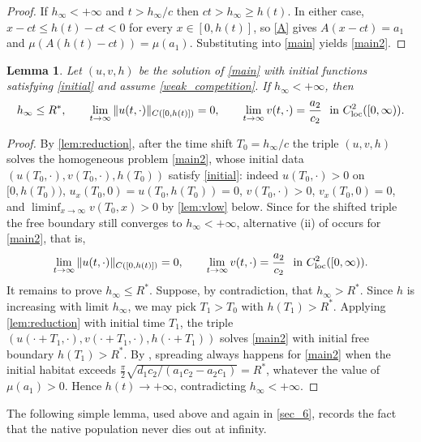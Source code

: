\documentclass[reqno]{amsart}
\theoremstyle{plain}
\newtheorem{lemma}[theorem]{Lemma}
\theoremstyle{definition}
\theoremstyle{remark}
\begin{document}
\begin{proof}
	If $h_\infty<+\infty$ and $t>h_\infty/c$ then $ct>h_\infty\ge h(t)$. In
	either case, $x-ct\le h(t)-ct<0$ for every $x\in[0,h(t)]$, so \eqref{A} gives
	$A(x-ct)=a_1$ and $\mu(A(h(t)-ct))=\mu(a_1)$. Substituting into \eqref{main}
	yields \eqref{main2}.
\end{proof}

\begin{lemma}\label{th1:lm1}
	Let $(u,v,h)$ be the solution of \eqref{main} with initial functions
	satisfying \eqref{initial} and assume \eqref{weak_competition}. If
	$h_\infty<+\infty$, then
	\[
	h_\infty\le R^*,\qquad
	\lim_{t\to\infty} \|u(t,\cdot)\|_{C([0, h(t)])} = 0,\qquad
	\lim_{t\to\infty} v(t,\cdot) = \frac{a_2}{c_2}\ \text{ in } C^2_{\rm loc}([0,\infty)).
	\]
\end{lemma}

\begin{proof}
	By \cref{lem:reduction}, after the time shift $T_0=h_\infty/c$ the triple
	$(u,v,h)$ solves the homogeneous problem \eqref{main2}, whose initial data
	$(u(T_0,\cdot),v(T_0,\cdot),h(T_0))$ satisfy \eqref{initial}: indeed
	$u(T_0,\cdot)>0$ on $[0,h(T_0))$, $u_x(T_0,0)=u(T_0,h(T_0))=0$, $v(T_0,\cdot)>0$,
	$v_x(T_0,0)=0$, and $\liminf_{x\to\infty}v(T_0,x)>0$ by \cref{lem:vlow} below.
	Since for the shifted triple the free boundary still converges to
	$h_\infty<+\infty$, alternative (ii) of \cite[Theorem 1.1]{MR3986328} occurs
	for \eqref{main2}, that is,
	\[
	\lim_{t\to\infty}\|u(t,\cdot)\|_{C([0,h(t)])}=0,\qquad
	\lim_{t\to\infty}v(t,\cdot)=\frac{a_2}{c_2}\ \text{ in }C^2_{\rm loc}([0,\infty)).
	\]
	It remains to prove $h_\infty\le R^*$. Suppose, by contradiction, that
	$h_\infty>R^*$. Since $h$ is increasing with limit $h_\infty$, we may pick
	$T_1>T_0$ with $h(T_1)>R^*$. Applying \cref{lem:reduction} with initial time
	$T_1$, the triple $(u(\cdot+T_1,\cdot),v(\cdot+T_1,\cdot),h(\cdot+T_1))$
	solves \eqref{main2} with initial free boundary $h(T_1)>R^*$. By
	\cite[Theorem 1.2]{MR3986328}, spreading always happens for \eqref{main2} when
	the initial habitat exceeds
	$\frac{\pi}{2}\sqrt{d_1c_2/(a_1c_2-a_2c_1)}=R^*$, whatever the value of
	$\mu(a_1)>0$. Hence $h(t)\to+\infty$, contradicting $h_\infty<+\infty$.
\end{proof}

The following simple lemma, used above and again in \cref{sec_6}, records the
fact that the native population never dies out at infinity.
\end{document}
